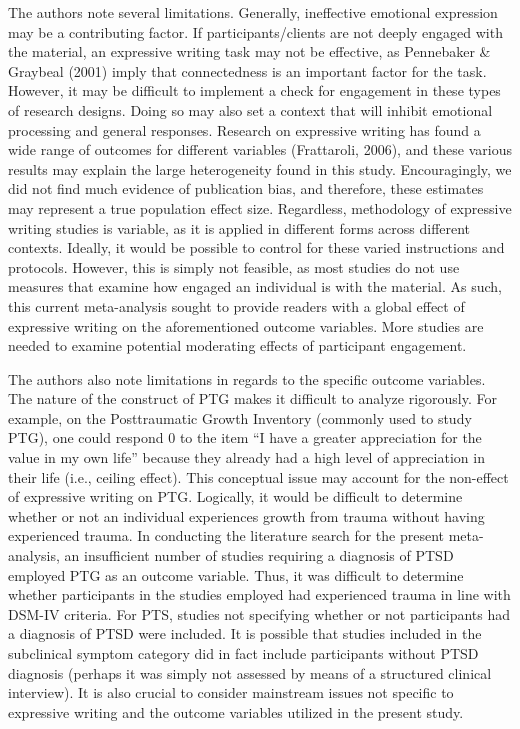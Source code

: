 \documentclass[man, mask]{apa6}
\newcounter{author}
\theoremstyle{definition}
\theoremstyle{definition}
\theoremstyle{definition}
\theoremstyle{remark}
\begin{document}
The authors note several limitations. Generally, ineffective emotional
expression may be a contributing factor. If participants/clients are not
deeply engaged with the material, an expressive writing task may not be
effective, as Pennebaker \& Graybeal (2001) imply that connectedness is
an important factor for the task. However, it may be difficult to
implement a check for engagement in these types of research designs.
Doing so may also set a context that will inhibit emotional processing
and general responses. Research on expressive writing has found a wide
range of outcomes for different variables (Frattaroli, 2006), and these
various results may explain the large heterogeneity found in this study.
Encouragingly, we did not find much evidence of publication bias, and
therefore, these estimates may represent a true population effect size.
Regardless, methodology of expressive writing studies is variable, as it
is applied in different forms across different contexts. Ideally, it
would be possible to control for these varied instructions and
protocols. However, this is simply not feasible, as most studies do not
use measures that examine how engaged an individual is with the
material. As such, this current meta-analysis sought to provide readers
with a global effect of expressive writing on the aforementioned outcome
variables. More studies are needed to examine potential moderating
effects of participant engagement.

The authors also note limitations in regards to the specific outcome
variables. The nature of the construct of PTG makes it difficult to
analyze rigorously. For example, on the Posttraumatic Growth Inventory
(commonly used to study PTG), one could respond 0 to the item \enquote{I
have a greater appreciation for the value in my own life} because they
already had a high level of appreciation in their life (i.e., ceiling
effect). This conceptual issue may account for the non-effect of
expressive writing on PTG. Logically, it would be difficult to determine
whether or not an individual experiences growth from trauma without
having experienced trauma. In conducting the literature search for the
present meta-analysis, an insufficient number of studies requiring a
diagnosis of PTSD employed PTG as an outcome variable. Thus, it was
difficult to determine whether participants in the studies employed had
experienced trauma in line with DSM-IV criteria. For PTS, studies not
specifying whether or not participants had a diagnosis of PTSD were
included. It is possible that studies included in the subclinical
symptom category did in fact include participants without PTSD diagnosis
(perhaps it was simply not assessed by means of a structured clinical
interview). It is also crucial to consider mainstream issues not
specific to expressive writing and the outcome variables utilized in the
present study.
\end{document}
